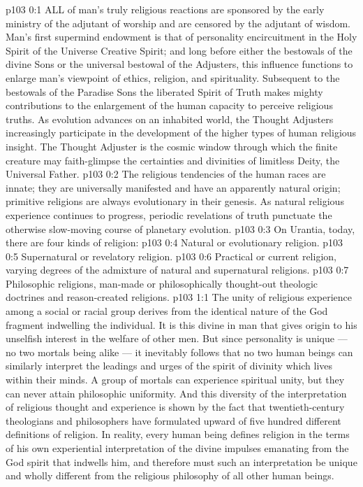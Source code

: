 \vs p103 0:1 ALL of man’s truly religious reactions are sponsored by the early ministry of the adjutant of worship and are censored by the adjutant of wisdom. Man’s first supermind endowment is that of personality encircuitment in the Holy Spirit of the Universe Creative Spirit; and long before either the bestowals of the divine Sons or the universal bestowal of the Adjusters, this influence functions to enlarge man’s viewpoint of ethics, religion, and spirituality. Subsequent to the bestowals of the Paradise Sons the liberated Spirit of Truth makes mighty contributions to the enlargement of the human capacity to perceive religious truths. As evolution advances on an inhabited world, the Thought Adjusters increasingly participate in the development of the higher types of human religious insight. The Thought Adjuster is the cosmic window through which the finite creature may faith\hyp{}glimpse the certainties and divinities of limitless Deity, the Universal Father.
\vs p103 0:2 The religious tendencies of the human races are innate; they are universally manifested and have an apparently natural origin; primitive religions are always evolutionary in their genesis. As natural religious experience continues to progress, periodic revelations of truth punctuate the otherwise slow\hyp{}moving course of planetary evolution.
\vs p103 0:3 \pc On Urantia, today, there are four kinds of religion:
\vs p103 0:4 \bibnobreakspace Natural or evolutionary religion.
\vs p103 0:5 \bibnobreakspace Supernatural or revelatory religion.
\vs p103 0:6 \bibnobreakspace Practical or current religion, varying degrees of the admixture of natural and supernatural religions.
\vs p103 0:7 \bibnobreakspace Philosophic religions, man\hyp{}made or philosophically thought\hyp{}out theologic doctrines and reason\hyp{}created religions.
\vs p103 1:1 The unity of religious experience among a social or racial group derives from the identical nature of the God fragment indwelling the individual. It is this divine in man that gives origin to his unselfish interest in the welfare of other men. But since personality is unique --- no two mortals being alike --- it inevitably follows that no two human beings can similarly interpret the leadings and urges of the spirit of divinity which lives within their minds. A group of mortals can experience spiritual unity, but they can never attain philosophic uniformity. And this diversity of the interpretation of religious thought and experience is shown by the fact that twentieth\hyp{}century theologians and philosophers have formulated upward of five hundred different definitions of religion. In reality, every human being defines religion in the terms of his own experiential interpretation of the divine impulses emanating from the God spirit that indwells him, and therefore must such an interpretation be unique and wholly different from the religious philosophy of all other human beings.
